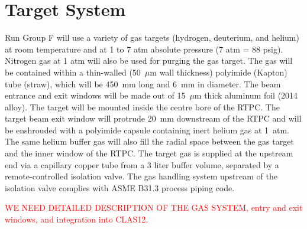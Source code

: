 \section{Target System}

Run Group F will use a variety of gas targets (hydrogen, deuterium, and helium) 
at room temperature and at 1 to 7 atm absolute pressure (7 atm = 88 psig).  
Nitrogen gas at 1 atm will also be used for purging the gas target. The gas 
will be contained within a thin-walled (50~$\mu$m wall thickness) polyimide 
(Kapton) tube (straw), which will be 450~mm long and 6~mm in diameter. The beam 
entrance and exit windows will be made out of 15~$\mu$m thick aluminum foil 
(2014 alloy). The target will be mounted inside the centre bore of the RTPC.  
The target beam exit window will protrude 20~mm downstream of the RTPC and will 
be enshrouded with a polyimide capsule containing inert helium gas at 1~atm.
The same helium buffer gas will also fill the radial space between the gas 
target and the inner window of the RTPC. The target gas is supplied at the 
upstream end via a capillary copper tube from a 3 liter buffer volume, 
separated by a remote-controlled isolation valve. The gas handling system 
upstream of the isolation valve complies with ASME B31.3 process piping code.


\textcolor{red}{WE NEED DETAILED DESCRIPTION OF THE GAS SYSTEM, entry and exit 
windows, and integration into CLAS12.}

%   
               
